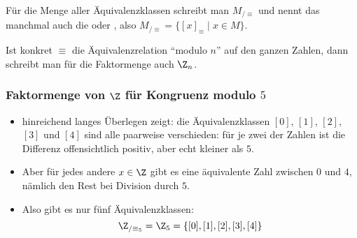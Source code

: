 Für die Menge aller Äquivalenzklassen schreibt man $M_{/\equiv}$ und
nennt das manchmal auch die 
oder , also $M_{/\equiv} = \{ [x]_{\equiv} \mid
x\in M\}$.

Ist konkret $\equiv$ die Äquivalenzrelation "`modulo $n$"' auf den
ganzen Zahlen, dann schreibt man für die Faktormenge auch $\Z_n$.

\begin{tutorium}
  \subsubsection*{Faktormenge von $\Z$ für Kongruenz modulo $5$}
  \begin{itemize}
  \item hinreichend langes Überlegen zeigt: die Äquivalenzklassen
    $[0]$, $[1]$, $[2]$, $[3]$ und $[4]$ sind alle paarweise
    verschieden: für je zwei der Zahlen ist die Differenz
    offensichtlich positiv, aber echt kleiner als $5$.
  \item Aber für jedes andere $x\in\Z$ gibt es eine äquivalente Zahl
    zwischen $0$ und $4$, nämlich den Rest bei Division durch $5$.
  \item Also gibt es nur fünf Äquivalenzklassen:
    \[
    \Z_{/\equiv_5} = \Z_5 = \{  [0], [1], [2], [3], [4] \}
    \]
  \end{itemize}
\end{tutorium}
